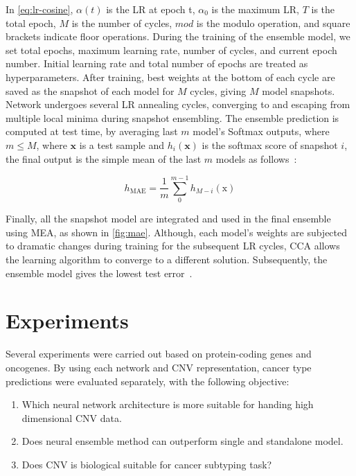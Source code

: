 \hspace*{3.5mm} In \cref{eq:lr-cosine}, $\alpha(t)$ is the LR at epoch t, $\alpha_0$ is the maximum LR, $T$ is the total epoch, $M$ is the number of cycles, $mod$ is the modulo operation, and square brackets indicate floor operations. During the training of the ensemble model, we set total epochs, maximum learning rate, number of cycles, and current epoch number. Initial learning rate and total number of epochs are treated as hyperparameters. After training, best weights at the bottom of each cycle are saved as the snapshot of each model for $M$ cycles, giving $M$ model snapshots. Network undergoes several LR annealing cycles, converging to and escaping from multiple local minima during snapshot ensembling. The ensemble prediction is computed at test time, by averaging last $m$ model's Softmax outputs, where $m \leq M$, where $\mathbf{x}$ is a test sample and $h_i \left(\mathbf{x} \right)$ is the softmax score of snapshot $i$, the final output is the simple mean of the last $m$ models as follows~\cite{huang2017snapshot}: 

\vspace{-2mm}
\begin{equation}
    h_{\mathrm{MAE}}=\frac{1}{m} \sum_{0}^{m-1} h_{M-i}(\mathrm{x})
    \label{eq:mae}
\end{equation}

\hspace*{3.5mm} Finally, all the snapshot model are integrated and used in the final ensemble using MEA, as shown in \cref{fig:mae}. Although, each model's weights are subjected to dramatic changes during training for the subsequent LR cycles, CCA allows the learning algorithm to converge to a different solution. Subsequently, the ensemble model gives the lowest test error~\cite{huang2017snapshot}. %

\section{Experiments}\label{chapter_3:results}
Several experiments were carried out based on protein-coding genes and oncogenes. By using each network and CNV representation, cancer type predictions were evaluated separately, with the following objective:

\begin{enumerate}[noitemsep]
    \item Which neural network architecture is more suitable for handing high dimensional CNV data. 
    \item Does neural ensemble method can outperform single and standalone model.
    \item Does CNV is biological suitable for cancer subtyping task? 
\end{enumerate}

